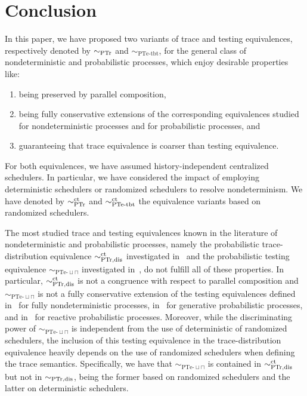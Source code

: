 \documentclass{LMCS}
\newcommand{\sbis}[1]
	{\sim_{#1}}
\begin{document}
\section{Conclusion}
\label{sec:concl}


In this paper, we have proposed two variants of trace and testing equivalences, respectively denoted by
$\sbis{\rm PTr}$ and $\sbis{\textrm{PTe-tbt}}$, for the general class of nondeterministic and probabilistic
processes, which enjoy desirable properties like:

	\begin{enumerate}

\item being preserved by parallel composition, 

\item being fully conservative extensions of the corresponding equivalences studied for nondeterministic
processes and for probabilistic processes, and

\item guaranteeing that trace equivalence is coarser than testing equivalence.

	\end{enumerate}

\noindent
For both equivalences, we have assumed history-independent centralized schedulers. In particular, we have
considered the impact of employing deterministic schedulers or randomized schedulers to resolve
nondeterminism. We have denoted by $\sbis{\rm PTr}^{\rm ct}$ and $\sbis{\textrm{PTe-tbt}}^{\rm ct}$ the
equivalence variants based on randomized schedulers.

The most studied trace and testing equivalences known in the literature of nondeterministic and
probabilistic processes, namely the probabilistic trace-distribution equivalence $\sbis{\rm PTr,dis}^{\rm
ct}$ investigated in~\cite{Seg95b,CSV07,LSV03,PS04,CLSV06} and the probabilistic testing equivalence
$\sbis{\textrm{PTe-}\sqcup\sqcap}$ investigated in~\cite{YL92,JY95,Seg96,DGHM08}, do not fulfill all of
these properties. In particular, $\sbis{\rm PTr,dis}^{\rm ct}$ is not a congruence with respect to parallel
composition and $\sbis{\textrm{PTe-}\sqcup\sqcap}$ is not a fully conservative extension of the testing
equivalences defined in~\cite{DH84} for fully nondeterministic processes, in~\cite{CDSY99} for generative
probabilistic processes, and in~\cite{KN98} for reactive probabilistic processes. Moreover, while the
discriminating power of $\sbis{\textrm{PTe-}\sqcup\sqcap}$ is independent from the use of deterministic of
randomized schedulers, the inclusion of this testing equivalence in the trace-distribution equivalence
heavily depends on the use of randomized schedulers when defining the trace semantics. Specifically, we have
that $\sbis{\textrm{PTe-}\sqcup\sqcap}$ is contained in $\sbis{\rm PTr,dis}^{\rm ct}$ but not in $\sbis{\rm
PTr,dis}$, being the former based on randomized schedulers and the latter on deterministic schedulers.
\end{document}
